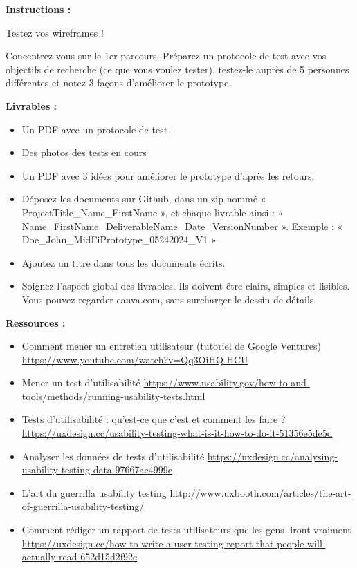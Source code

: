 \makeheaderfiles

\textbf{Instructions :}

Testez vos wireframes !

Concentrez-vous sur le 1er parcours. Préparez un protocole de test avec vos objectifs de recherche (ce que vous voulez tester), testez-le auprès de 5 personnes différentes et notez 3 façons d'améliorer le prototype.

\textbf{Livrables :}

\begin{itemize}
\item Un PDF avec un protocole de test
\item Des photos des tests en cours
\item Un PDF avec 3 idées pour améliorer le prototype d'après les retours.
\item Déposez les documents sur Github, dans un zip nommé « ProjectTitle\_Name\_FirstName », et chaque livrable ainsi : « Name\_FirstName\_DeliverableName\_Date\_VersionNumber ». Exemple : « Doe\_John\_MidFiPrototype\_05242024\_V1 ».
\item Ajoutez un titre dans tous les documents écrits.
\item Soignez l'aspect global des livrables. Ils doivent être clairs, simples et lisibles. Vous pouvez regarder canva.com, sans surcharger le dessin de détails.
\end{itemize}

\textbf{Ressources :}

\begin{itemize}
\item Comment mener un entretien utilisateur (tutoriel de Google Ventures) \url{https://www.youtube.com/watch?v=Qq3OiHQ-HCU}
\item Mener un test d'utilisabilité \url{https://www.usability.gov/how-to-and-tools/methods/running-usability-tests.html}
\item Tests d'utilisabilité : qu'est-ce que c'est et comment les faire ? \url{https://uxdesign.cc/usability-testing-what-is-it-how-to-do-it-51356e5de5d}
\item Analyser les données de tests d'utilisabilité \url{https://uxdesign.cc/analysing-usability-testing-data-97667ae4999e}
\item L'art du guerrilla usability testing \url{http://www.uxbooth.com/articles/the-art-of-guerrilla-usability-testing/}
\item Comment rédiger un rapport de tests utilisateurs que les gens liront vraiment \url{https://uxdesign.cc/how-to-write-a-user-testing-report-that-people-will-actually-read-652d15d2f92e}
\end{itemize}

